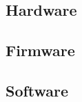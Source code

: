 \documentclass[../../main.tex]{subfiles}
\begin{document}
\subsection{Hardware}\label{subsec:hardware}


\subsection{Firmware}\label{subsec:firmware}


\subsection{Software}\label{subsec:software}

\end{document}
